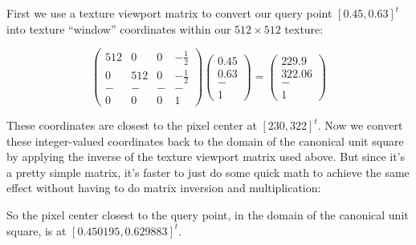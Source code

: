 \documentclass[11pt]{tingpset}
\begin{document}

  First we use a texture viewport matrix to convert our query point $[0.45, 0.63]^t$ into texture ``window'' coordinates within our $512 \times 512$ texture:

  \[
    \begin{pmatrix}
      512 & 0 & 0 & -\frac{1}{2} \\
      0 & 512 & 0 & -\frac{1}{2} \\
      - & - & - & - \\
      0 & 0 & 0 & 1
    \end{pmatrix}
    \begin{pmatrix}
      0.45 \\
      0.63 \\
      - \\
      1
    \end{pmatrix}
    =
    \begin{pmatrix}
      229.9 \\
      322.06 \\
      - \\
      1
    \end{pmatrix}
  \]

  These coordinates are closest to the pixel center at $[230, 322]^t$. Now we convert these integer-valued coordinates back to the domain of the canonical unit square by applying the inverse of the texture viewport matrix used above. But since it's a pretty simple matrix, it's faster to just do some quick math to achieve the same effect without having to do matrix inversion and multiplication:


  So the pixel center closest to the query point, in the domain of the canonical unit square, is at $[0.450195, 0.629883]^t$.

  \pagebreak
\end{document}

